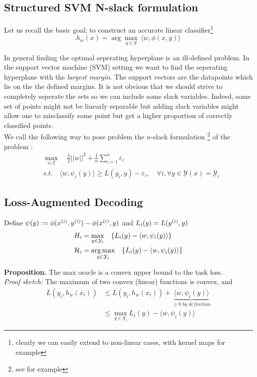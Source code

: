 \subsection{Structured SVM N-slack formulation}
Let us recall the basic goal; to construct an accurate linear
classifier\footnote{clearly we can easily extend to non-linear cases, with kernel maps for example}
\begin{equation}
  h_{w}(x)= \arg\max_{y\in \mathcal Y} \, \langle w, \phi(x,y)\rangle
\end{equation}

In general finding the optimal seperating hyperplane is an ill-defined problem.
In the support vector machine (SVM) setting we want to find the seperating
hyperplane with the \emph{largest margin}. The support vectors are the
datapoints which lie on the the defined margins. It is not obvious
that we should strive to completely seperate the sets so we can include some
slack variables. Indeed, some set of points might not be linearly separable but
adding slack variables might allow one to misclassify some point but get 
a higher proportion of correctly classified points.\\

We call the following way to pose problem the $n$-slack formulation
\footnote{see \citet{moguerzaSupportVectorMachines2006} for example} of the problem :
\begin{align}
    &\max_{\omega, \xi}\quad\frac{\lambda}{2}||w||^{2}+ \frac{1}{n}\sum_{i=1}^{n}\varepsilon_{i}\\
    &\textit{s.t.}\quad \langle w, \psi_{i}(y)\rangle \geq L(y_{i},y)-
\varepsilon_{i},\quad\forall i ,\forall y \in\mathcal{Y}(x)=\mathcal{Y}_{i}
\end{align}

\subsection{Loss-Augmented Decoding}
Define $\psi(y) := \phi(x^{(i)},y^{(i)}) - \phi(x^{(i)},y)$ and $L_i(y) = L(y^{(i)}, y)$
\begin{align}
H_i &= \max_{y\in\mathcal{Y}_{i}} \quad \{L_{i}(y)- \langle w, \psi_{i}(y)\rangle\} \\
\mathcal H_i &= \operatorname*{\arg\max}_{y\in\mathcal{Y}_{i}} \quad \{ L_{i}(y)- \langle w, \psi_{i}(y)\rangle \}
\end{align}

\textbf{Proposition.} The max oracle is a convex upper bound to the task loss.\\
\textit{Proof sketch:} The maximum of two convex (linear) functions is convex, and
\begin{equation*}
\begin{align} L(y_{i},h_{w}(x_{i})) &\leq L(y_{i},h_{w}(x_{i})) +
        \underbrace{\langle w, \psi_{i}(y)\rangle}_{\geq 0 \textit{ by definition}} \\
    \quad\quad &\leq \max_{y\in\mathcal{Y}_{i}} L_{i}(y)- \langle w, \psi_{i}(y)\rangle
\end{align}
\end{equation*}

